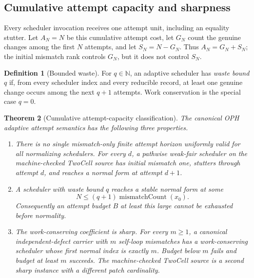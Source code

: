 \documentclass[11pt]{article}
\newtheorem{theorem}{Theorem}[section]
\theoremstyle{definition}
\newtheorem{definition}[theorem]{Definition}
\theoremstyle{remark}
\numberwithin{equation}{section}
\begin{document}
\subsection{Cumulative attempt capacity and sharpness}

Every scheduler invocation receives one attempt unit, including an
equality stutter.  Let \(A_N=N\) be this cumulative attempt cost, let \(G_N\)
count the genuine changes among the first \(N\) attempts, and let
\(S_N=N-G_N\).  Thus \(A_N=G_N+S_N\); the initial mismatch rank controls
\(G_N\), but it does not control \(S_N\).

\begin{definition}[Bounded waste]
For \(q\in\mathbb N\), an adaptive scheduler has \emph{waste bound} \(q\) if,
from every scheduler index and every reducible record, at least one genuine
change occurs among the next \(q+1\) attempts.  Work conservation is the
special case \(q=0\).
\end{definition}

\begin{theorem}[Cumulative attempt-capacity classification]
\label{thm:oph-cumulative-attempt-capacity}
The canonical OPH adaptive attempt semantics has the following three
properties.
\begin{enumerate}[label=(\roman*)]
\item There is no single mismatch-only finite attempt horizon uniformly valid
for all normalizing schedulers.  For every \(d\), a pathwise weak-fair scheduler on the machine-checked
TwoCell source has initial mismatch one, stutters through attempt \(d\), and
reaches a normal form at attempt \(d+1\).
\item A scheduler with waste bound \(q\) reaches a stable normal form at some
\[
N\le(q+1)\operatorname{mismatchCount}(x_0).
\]
Consequently an attempt budget \(B\) at least this large cannot be exhausted
before normality.
\item The work-conserving coefficient is sharp.  For every \(m\ge1\), a
canonical independent-defect carrier with \(m\) self-loop mismatches has a
work-conserving scheduler whose first normal index is exactly \(m\).  Budget
below \(m\) fails and budget at least \(m\) succeeds.  The machine-checked TwoCell
source is a second sharp instance with a different patch cardinality.
\end{enumerate}
\end{theorem}
\end{document}
